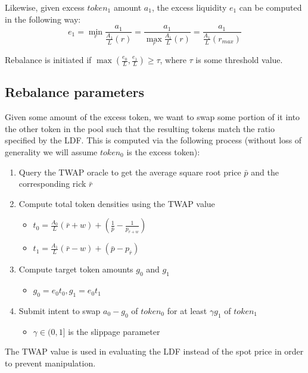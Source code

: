 \documentclass[twocolumn]{article}
\begin{document}
Likewise, given excess $token_1$ amount $a_1$, the excess liquidity $e_1$ can be computed in the following way: 
\begin{equation}
  e_1 = \min_r \frac{a_1}{\frac{A_1}{L}(r)} = \frac{a_1}{\max_r \frac{A_1}{L}(r)} = \frac{a_1}{\frac{A_1}{L}(r_{max})}  
\end{equation}

Rebalance is initiated if $\max(\frac{e_0}{L}, \frac{e_1}{L}) \ge \tau$, where $\tau$ is some threshold value.

\subsection{Rebalance parameters}

Given some amount of the excess token, we want to swap some portion of it into the other token in the pool such that the resulting tokens match the ratio specified by the LDF. This is computed via the following process (without loss of generality we will assume $token_0$ is the excess token):

\begin{enumerate}
  \item Query the TWAP oracle to get the average square root price $\bar p$ and the corresponding rick $\bar r$
  \item Compute total token densities using the TWAP value
    \begin{itemize}
      \item $t_0=\frac{A_0}{L}(\bar r+w) + (\frac{1}{\bar p}-\frac{1}{p_{\bar r+w}})$
      \item $t_1=\frac{A_1}{L}(\bar r-w) + (\bar p - p_{\bar r})$  
    \end{itemize}
  \item Compute target token amounts $g_0$ and $g_1$
    \begin{itemize}
      \item $g_0 = e_0t_0, g_1=e_0t_1$
    \end{itemize}
  \item Submit intent to swap $a_0-g_0$ of $token_0$ for at least $\gamma g_1$ of $token_1$
    \begin{itemize} 
      \item $\gamma \in (0, 1]$ is the slippage parameter
    \end{itemize}
\end{enumerate}

The TWAP value is used in evaluating the LDF instead of the spot price in order to prevent manipulation.
\end{document}
